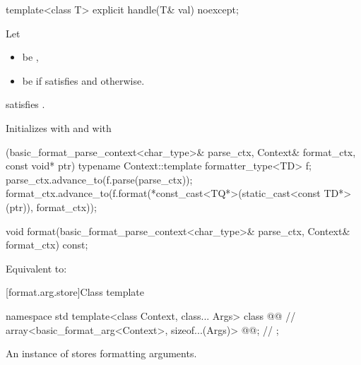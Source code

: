 %
\begin{itemdecl}
template<class T> explicit handle(T& val) noexcept;
\end{itemdecl}

\begin{itemdescr}
\pnum
Let
\begin{itemize}
\item
{} be ,
\item
{} be  if
 satisfies 
and  otherwise.
\end{itemize}

\pnum
\mandates
{} satisfies .

\pnum
\effects
Initializes
 with  and
 with
\begin{codeblock}
[](basic_format_parse_context<char_type>& parse_ctx,
   Context& format_ctx, const void* ptr) {
  typename Context::template formatter_type<TD> f;
  parse_ctx.advance_to(f.parse(parse_ctx));
  format_ctx.advance_to(f.format(*const_cast<TQ*>(static_cast<const TD*>(ptr)),
                                 format_ctx));
}
\end{codeblock}
\end{itemdescr}

%
\begin{itemdecl}
void format(basic_format_parse_context<char_type>& parse_ctx, Context& format_ctx) const;
\end{itemdecl}

\begin{itemdescr}
\pnum
\effects
Equivalent to: 
\end{itemdescr}

[format.arg.store]{Class template }

\begin{codeblock}
namespace std {
  template<class Context, class... Args>
  class @@ {                                      // \expos
    array<basic_format_arg<Context>, sizeof...(Args)> @@;     // \expos
  };
}
\end{codeblock}

\pnum
An instance of  stores formatting arguments.

